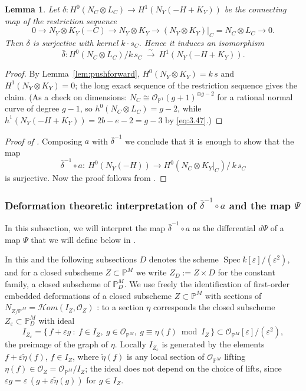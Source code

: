 \documentclass[11pt,reqno]{amsart}
\theoremstyle{plain}
\newtheorem{lemma}[theorem]{Lemma}
\theoremstyle{definition}
\newcommand{\PP}{\mathbb{P}}
\newcommand{\PM}{\mathbb{P}^M}
\newcommand{\OO}{\mathcal{O}}
\newcommand{\sHom}{\mathcal{H}om}
\newcommand{\NY}{N_{Y}}
\newcommand{\Dd}{D}
\begin{document}
\begin{lemma}\label{lem:delta}
Let $\delta\colon H^0(N_C\otimes L_C)\to H^1(\NY(-H+K_Y))$ be the connecting map of the restriction sequence
\[
0\to \NY\otimes K_Y(-C)\to \NY\otimes K_Y\to (\NY\otimes K_Y)|_C=N_C\otimes L_C\to 0 .
\]
Then $\delta$ is surjective with kernel $k\cdot s_C$. Hence it induces an isomorphism
\[
\bar\delta\colon H^0(N_C\otimes L_C)/k\,s_C\ \xrightarrow{\ \sim\ }\ H^1(\NY(-H+K_Y)) .
\]
\end{lemma}

\begin{proof}
By Lemma~\ref{lem:pushforward}, $H^0(\NY\otimes K_Y)=k\,s$ and $H^1(\NY\otimes K_Y)=0$; the long exact sequence of the restriction sequence gives the claim. (As a check on dimensions: $N_C\cong\OO_{\PP^1}(g+1)^{\oplus g-2}$ for a rational normal curve of degree $g-1$, so $h^0(N_C\otimes L_C)=g-2$, while $h^1(\NY(-H+K_Y))=2b-e-2=g-3$ by \eqref{eq:3.47}.)
\end{proof}



\begin{proof}[Proof of ]
Composing $a$ with $\bar\delta^{-1}$ we conclude that it is enough to show that the map
\begin{equation}\label{eq:themap}
\bar\delta^{-1}\circ a\colon\ H^0(\NY(-H))\longrightarrow H^0(N_C\otimes K_Y|_C)\big/\,k\,s_C
\end{equation}
is surjective. Now the proof follows from .   
\end{proof}


\subsubsection{Deformation theoretic interpretation of $\bar\delta^{-1}\circ a$ and the map $\Psi$}\label{subsec:geometric}

In this subsection, we will interpret the map $\bar\delta^{-1}\circ a$ as the differential $d\Psi$ of a map $\Psi$ that we will define below in . \par
In this and the following subsections $\Dd$ denotes the scheme $\operatorname{Spec}k[\varepsilon]/(\varepsilon^2)$, and for a closed subscheme $Z\subset\PM$ we write $Z_\Dd:=Z\times\Dd$ for the constant family, a closed subscheme of $\PM_\Dd$. We use freely the identification of first-order embedded deformations of a closed subscheme $Z\subset\PM$ with sections of $N_{Z/\PM}=\sHom(I_Z,\OO_Z)$ \cite[\S3.2]{Ser06}: to a section $\eta$ corresponds the closed subscheme $Z_\varepsilon\subset\PM_\Dd$ with ideal
\[
I_{Z_\varepsilon}=\{\,f+\varepsilon g\ :\ f\in I_Z,\ g\in\OO_{\PM},\ g\equiv\eta(f)\bmod I_Z\,\}\subset\OO_{\PM}[\varepsilon]/(\varepsilon^2),
\]
the preimage of the graph of $\eta$. Locally $I_{Z_\varepsilon}$ is generated by the elements $f+\varepsilon\tilde\eta(f)$, $f\in I_Z$, where $\tilde\eta(f)$ is any local section of $\OO_{\PM}$ lifting $\eta(f)\in\OO_Z=\OO_{\PM}/I_Z$; the ideal does not depend on the choice of lifts, since $\varepsilon g=\varepsilon\,(g+\varepsilon\tilde\eta(g))$ for $g\in I_Z$.
\end{document}
